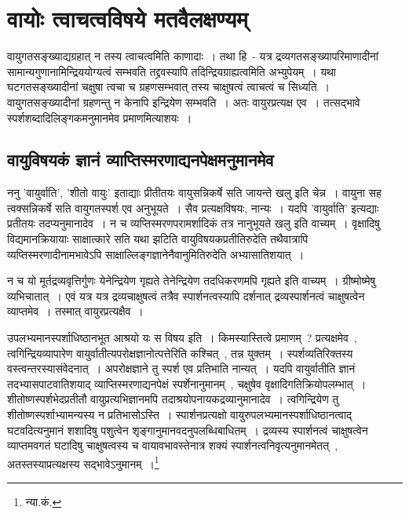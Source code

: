 	\section{वायोः त्वाचत्वविषये मतवैलक्षण्यम्}

	वायुगतसङ्ख्याद्यग्रहात् न तस्य त्वाचत्वमिति काणादाः~। तथा हि~-  यत्र द्रव्यगतसङ्ख्यापरिमाणादीनां सामान्यगुणानामिन्द्रिययोग्यत्वं सम्भवति तद्द्रवस्यापि तदिन्द्रियग्राह्यत्वमिति अभ्युपेयम्~।‌ यथा घटगतसङ्ख्यादीनां चक्षुषा त्वचा च ग्रहणसम्भवात् तस्य चाक्षुषत्वं त्वाचत्वं च सिध्यति~। वायुगतसङ्ख्यादीनां ग्रहणन्तु न केनापि इन्द्रियेण सम्भवति~। अतः वायुरप्रत्यक्ष एव~। तत्सद्भावे स्पर्शशब्दादिलिङ्गकमनुमानमेव प्रमाणमित्याशयः~।

		\subsection{वायुविषयकं ज्ञानं व्याप्तिस्मरणाद्यनपेक्षमनुमानमेव}

		 ननु 'वायुर्वाति', 'शीतो वायुः' इताद्याः प्रीतीतयः वायुसन्निकर्षे सति जायन्ते खलु इति चेन्न~। वायुना सह त्वक्सन्निकर्षे सति वायुगतस्पर्श एव अनुभूयते~। सैव प्रत्यक्षविषयः, नान्यः~। यदपि 'वायुर्वाति' इत्यद्याः प्रतीतयः तदप्यनुमानादेव~। न च व्यप्तिस्मरणपरामर्शादिकं तत्र नानुभूयते खलु इति वाच्यम्~। वृक्षादिषु विद्यमानक्रियायाः साक्षात्कारे सति यथा झटिति वायुविषयकप्रतीतिरुदेति तथैवात्रापि व्यप्तिस्मरणादीनामभावेऽपि साक्षाल्लिङ्गज्ञानेनैवानुमितिरुदेति अभ्यासातिशयात्~। 
		 
		 न च यो मूर्तद्रव्यवृत्तिर्गुणः येनेन्द्रियेण गृह्यते तेनेन्द्रियेण तदधिकरणमपि गृह्यते इति वाच्यम्~। ग्रीष्मोष्मेषु व्यभिचातात्~। एवं यत्र यत्र द्रव्यचाक्षुषत्वं तत्रैव स्पार्शनत्वस्यापि दर्शनात् द्रव्यस्पार्शनत्वं चाक्षुषत्वेन व्याप्तमेव~। तस्मात् वायुरप्रत्यक्षैव~।
		 
		{\fontsize{11.7}{0}\selectfont\s  उपलभ्यमानस्पर्शाधिष्ठानभूत आश्रयो यः स विषय इति~। किमस्यास्तित्वे प्रमाणम्~? प्रत्यक्षमेव~, त्वगिन्द्रियव्यापारेण वायुर्वातीत्यपरोक्षज्ञानोत्पत्तेरिति कश्चित्~, तन्न युक्तम्~। स्पर्शव्यतिरिक्तस्य वस्त्वन्तरस्यासंवेदनात्~। अपरोक्षज्ञाने तु स्पर्श एव प्रतिभाति नान्यत्~। यदपि वायुर्वातीति ज्ञानं तदभ्यासपाटवातिशयाद् व्याप्तिस्मरणाद्यनपेक्षं स्पर्शेनानुमानम्~, चक्षुषेव वृक्षादिगतिक्रियोपलम्भात्~। शीतोष्णस्पर्शभेदप्रतीतौ वायुप्रत्यभिज्ञानमपि तदाश्रयोपनायकद्रव्यानुमानादेव~। त्वगिन्द्रियेण तु शीतोष्णस्पर्शाभ्यामन्यस्य न प्रतिभासोऽस्ति~। स्पार्शनप्रत्यक्षो वायुरुपलभ्यमानस्पर्शाधिष्ठानत्वाद् घटवदित्यनुमानं शशादिषु पशुत्वेन शृङ्गानुमानवदनुपलब्धिबाधितम्~। द्रव्यस्य स्पार्शनत्वं चाक्षुषत्वेन व्याप्तमवगतं घटादिषु चाक्षुषत्वस्य च वायावभावस्तेनात्र शक्यं स्पार्शनत्वनिवृत्यनुमानमेतत्~, अतस्तस्याप्रत्यक्षस्य सद्भावेऽनुमानम्~।\footnote{न्या.कं.}}

